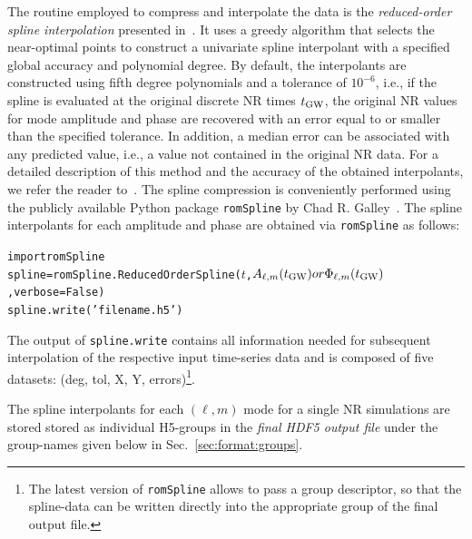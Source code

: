 \documentclass[11pt,tightenlines,article,amssymb,amsmath,amsfonts,superscriptaddress,nofootinbib]{revtex4}
\newcommand{\harald}[1]{\textcolor{Cerulean}{#1}}
\newcommand{\tGW}{t_{\rm GW}}
\begin{document}
The routine employed to compress and interpolate the data is the \emph{reduced-order spline interpolation} presented in~\cite{Galley:2016mvy}. It uses a greedy algorithm that selects the near-optimal points to construct a univariate spline interpolant with a specified global accuracy and polynomial degree.
By default, the interpolants are constructed using fifth degree polynomials and a tolerance of $10^{-6}$,
i.e., if the spline is evaluated at the original discrete NR times $\tGW$, the original NR values for mode amplitude and phase are recovered with an error equal to or smaller than the specified tolerance. In addition, a median error can be associated with any predicted value, i.e., a value not contained in the original NR data. 
For a detailed description of this method and the accuracy of the obtained interpolants, we refer the reader to~\cite{Galley:2016mvy}. The spline compression is conveniently performed using the publicly available Python package \texttt{romSpline} by Chad R. Galley~\cite{romspline}. The spline interpolants for each amplitude and phase are obtained via \verb"romSpline" as follows: 
\begin{alltt}
import romSpline 
spline = romSpline.ReducedOrderSpline(\(t\), \(A\sb{\ell,m}(\tGW) or \Phi\sb{\ell,m}(\tGW)\), verbose=False)
spline.write('filename.h5')
\end{alltt}
The output of \texttt{spline.write} contains all information needed for subsequent interpolation of the respective input time-series data and is composed of five datasets: (deg, tol, X, Y, errors)\footnote{\harald{The latest version of {\tt romSpline} allows to pass a group descriptor, so that the spline-data can be written directly into the appropriate group of the final output file.}}.

The spline interpolants for each $(\ell,m)$ mode for a single NR
simulations are stored stored as individual H5-groups in the
\emph{final HDF5 output file} under the group-names given below in Sec.~\ref{sec:format:groups}.



\end{document}
